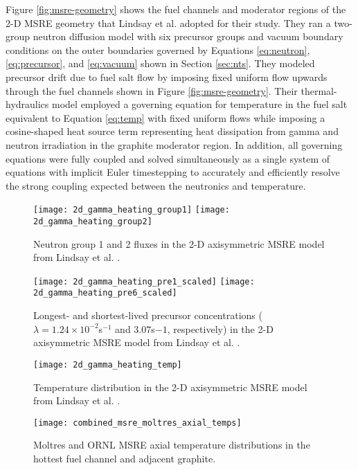 Figure \ref{fig:msre-geometry} shows the fuel channels and moderator regions of
the 2-D \gls{MSRE} geometry that Lindsay et al. adopted for their study.
They ran a two-group neutron diffusion model with six precursor groups and
vacuum boundary conditions on the outer boundaries governed by Equations
\ref{eq:neutron}, \ref{eq:precursor}, and \ref{eq:vacuum} shown in Section
\ref{sec:nts}. They modeled precursor drift due to fuel salt flow by imposing
fixed uniform flow upwards through the fuel channels shown in Figure
\ref{fig:msre-geometry}. Their thermal-hydraulics model employed a
governing equation for temperature in the fuel salt equivalent to Equation
\ref{eq:temp} with fixed uniform flows while imposing a cosine-shaped heat
source term representing heat dissipation from gamma and neutron irradiation in
the graphite moderator region. In addition, all governing equations were fully
coupled and solved simultaneously as a single system of equations with implicit
Euler timestepping to accurately and efficiently resolve the strong coupling
expected between the neutronics and temperature.

\begin{figure}[htb!]
	\centering
	\texttt{[image: 2d\_gamma\_heating\_group1]}
	\texttt{[image: 2d\_gamma\_heating\_group2]}
	\caption{Neutron group 1 and 2 fluxes in the 2-D axisymmetric \gls{MSRE}
	model from Lindsay et al. \cite{lindsay_introduction_2018}.}
	\label{fig:msre-flux}
\end{figure}

\begin{figure}[htb!]
	\centering
	\texttt{[image: 2d\_gamma\_heating\_pre1\_scaled]}
	\texttt{[image: 2d\_gamma\_heating\_pre6\_scaled]}
	\caption{Longest- and shortest-lived precursor concentrations ($\lambda =
	1.24\times 10^{-2}$s$^{-1}$ and $3.07$s${-1}$, respectively) in the 2-D
	axisymmetric \gls{MSRE} model from Lindsay et al.
	\cite{lindsay_introduction_2018}.}
	\label{fig:msre-precursor}
\end{figure}

\begin{figure}[htb!]
	\centering
	\begin{minipage}[b]{0.45\columnwidth}
	    \texttt{[image: 2d\_gamma\_heating\_temp]}
	    \caption{Temperature distribution in the 2-D
	    axisymmetric \gls{MSRE} model from Lindsay et al.
	    \cite{lindsay_introduction_2018}.}
	    \label{fig:msre-temp}
	\end{minipage}
	\hfill
	\begin{minipage}[b]{0.45\columnwidth}
	    \texttt{[image: combined\_msre\_moltres\_axial\_temps]}
	    \caption{Moltres \cite{lindsay_introduction_2018} and \gls{ORNL}
	    \gls{MSRE} \cite{briggs_molten-salt_1964} axial temperature
	    distributions in the hottest fuel channel and adjacent graphite.}
	    \label{fig:msre-temp-plot}
	\end{minipage}
\end{figure}

